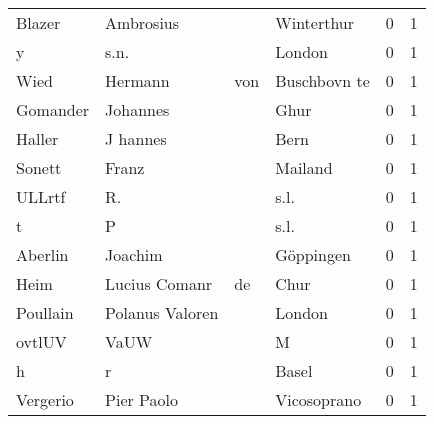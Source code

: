 \begin{tabular}{llllrr}
                   Blazer &                          Ambrosius &             &                                  Winterthur &          0 &         1 \\
                        y &                               s.n. &             &                                      London &          0 &         1 \\
                     Wied &                            Hermann &         von &                                Buschbovn te &          0 &         1 \\
                 Gomander &                           Johannes &             &                                        Ghur &          0 &         1 \\
                   Haller &                           J hannes &             &                                        Bern &          0 &         1 \\
                   Sonett &                              Franz &             &                                     Mailand &          0 &         1 \\
                   ULLrtf &                                 R. &             &                                        s.l. &          0 &         1 \\
                        t &                                  P &             &                                        s.l. &          0 &         1 \\
                  Aberlin &                            Joachim &             &                                   Göppingen &          0 &         1 \\
                     Heim &                      Lucius Comanr &          de &                                        Chur &          0 &         1 \\
                 Poullain &                    Polanus Valoren &             &                                      London &          0 &         1 \\
                   ovtlUV &                               VaUW &             &                                           M &          0 &         1 \\
                        h &                                  r &             &                                       Basel &          0 &         1 \\
                 Vergerio &                         Pier Paolo &             &                                 Vicosoprano &          0 &         1 \\

\end{tabular}
